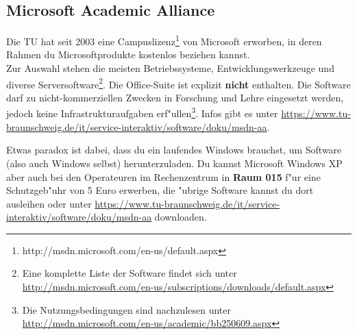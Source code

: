 \subsection{Microsoft Academic Alliance}
\label{msdnaa}
Die TU hat seit 2003 eine
Campuslizenz\footnote{http://msdn.microsoft.com/en-us/default.aspx}
von Microsoft erworben, in deren Rahmen du Microsoftprodukte kostenlos
beziehen kannst.\\
Zur Auswahl stehen die meisten Betriebssysteme, Entwicklungswerkzeuge und
diverse Serversoftware\footnote{\sloppy Eine komplette Liste der Software
findet sich unter \url{http://msdn.microsoft.com/en-us/subscriptions/downloads/default.aspx}}.
Die Office-Suite ist explizit \textbf{nicht} enthalten.
Die Software darf zu nicht-kommerziellen Zwecken in Forschung und Lehre
eingesetzt werden, jedoch keine Infrastrukturaufgaben
erf"ullen\footnote{Die Nutzungsbedingungen sind nachzulesen unter
\url{http://msdn.microsoft.com/en-us/academic/bb250609.aspx}}.
Infos gibt es unter
\url{https://www.tu-braunschweig.de/it/service-interaktiv/software/doku/msdn-aa}.


Etwas paradox ist dabei, dass du ein laufendes Windows brauchst, um Software 
(also auch Windows selbst) herunterzuladen. Du kannst Microsoft Windows XP 
aber auch bei den Operateuren im Rechenzentrum in \textbf{Raum 015}
f"ur eine Schutzgeb"uhr von 5 Euro erwerben, die "ubrige Software kannst du
dort ausleihen oder unter
\url{https://www.tu-braunschweig.de/it/service-interaktiv/software/doku/msdn-aa}
downloaden.
